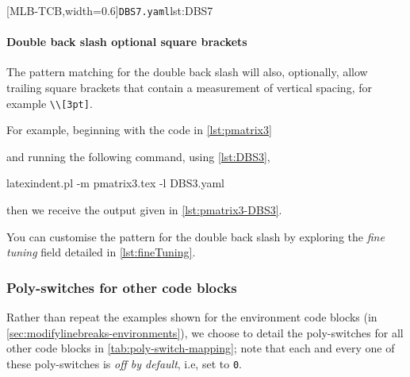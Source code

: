 		\begin{cmhtcbraster}[
				raster force size=false,
				raster column 1/.style={add to width=-.1\textwidth},
				raster column skip=.03\linewidth]
			[MLB-TCB,width=0.6\textwidth]{\texttt{DBS7.yaml}}{lst:DBS7}
		\end{cmhtcbraster}

	\paragraph{Double back slash optional square brackets}
		The pattern matching for the double back slash will also, optionally, allow trailing
		square brackets that contain a measurement of vertical spacing, for example
		\lstinline!\\[3pt]!.

		For example, beginning with the code in \cref{lst:pmatrix3}


		and running the following command, using \cref{lst:DBS3},
		\begin{commandshell}
latexindent.pl -m pmatrix3.tex -l DBS3.yaml
\end{commandshell}
		then we receive the output given in \cref{lst:pmatrix3-DBS3}.


		You can customise the pattern for the double back slash by exploring the \emph{fine
			tuning} field detailed in \vref{lst:fineTuning}.

\subsubsection{Poly-switches for other code blocks}
	Rather than repeat the examples shown for the environment code blocks (in
	\vref{sec:modifylinebreaks-environments}), we choose to detail the poly-switches for all
	other code blocks in \cref{tab:poly-switch-mapping}; note that each and every one of
	these poly-switches is \emph{off by default}, i.e, set to \texttt{0}.

